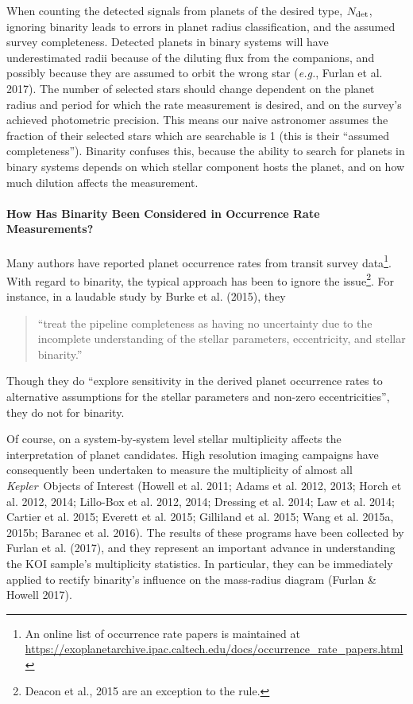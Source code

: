 When counting the detected signals from planets of the desired 
type, $N_{\rm det}$, ignoring binarity leads to errors in planet radius 
classification, and the assumed survey completeness.
Detected planets in binary systems will have underestimated radii because of 
the diluting flux from the companions, and possibly because they are assumed 
to orbit the wrong star ({\it e.g.}, Furlan et al. 2017).
The number of selected stars should change dependent on the planet radius 
and period for which the rate measurement is desired, and on the survey's 
achieved photometric precision.
This means our naive astronomer assumes the fraction of their selected stars 
which are searchable is 1 (this is their ``assumed completeness'').
Binarity confuses this, because the ability to search for planets 
in binary systems depends on which stellar component hosts the planet, and on 
how much dilution affects the measurement.

\paragraph{How Has Binarity Been Considered in Occurrence Rate Measurements?}
Many authors have reported planet occurrence rates from transit 
survey data\footnote{
    An online list of occurrence rate papers is maintained at 
    \url{https://exoplanetarchive.ipac.caltech.edu/docs/occurrence_rate_papers.html}
}.
With regard to binarity, the typical approach has been to ignore the 
issue\footnote{Deacon et al., 2015 are an exception to the rule.}.
For instance, in a laudable study by Burke et al. (2015), they
\begin{quote}
``treat the pipeline completeness as having no uncertainty 
due to the incomplete understanding of the stellar parameters, eccentricity, 
and stellar binarity.''
\end{quote}
Though they do ``explore sensitivity in the derived planet occurrence rates 
to alternative assumptions for the stellar parameters and non-zero 
eccentricities'', they do not for binarity.

Of course, on a system-by-system level stellar multiplicity affects the 
interpretation of planet candidates. High resolution imaging 
campaigns have consequently been undertaken to measure the multiplicity of 
almost all {\it Kepler}\ Objects of Interest 
(Howell et al. 2011; Adams et al. 2012, 2013; Horch et al. 2012, 2014; 
Lillo-Box et al. 2012, 2014; Dressing et al. 2014; Law et al. 2014; Cartier et 
al. 2015; Everett et al. 2015; Gilliland et al. 2015; Wang et al. 2015a, 
2015b; Baranec et al. 2016).
The results of these programs have been collected by Furlan et al. 
(2017), and they represent an important advance in understanding the KOI 
sample's multiplicity statistics.
In particular, they can be immediately applied to rectify binarity's influence 
on the mass-radius diagram (Furlan \& Howell 2017).

